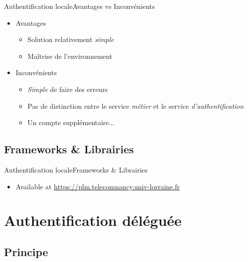 \documentclass{beamer}
\begin{document}
\begin{frame}{Authentification locale}{Avantages vs Inconvénients}
  \begin{center}
    \begin{itemize}
      \item Avantages
      \begin{itemize}
        \item Solution relativement \emph{simple}
        \item Maîtrise de l'environnement
      \end{itemize}
      \pause
      \item Inconvénients
      \begin{itemize}
        \item \emph{Simple} de faire des erreurs
        \item Pas de distinction entre le service \emph{métier} et le service \emph{d'authentification}
        \item Un compte supplémentaire...
      \end{itemize}
    \end{itemize}
  \end{center}
\end{frame}

\subsection{Frameworks \& Librairies}

\begin{frame}{Authentification locale}{Frameworks \& Librairies}
  \begin{center}
    \begin{itemize}
    \item Available at \url{https://plm.telecomnancy.univ-lorraine.fr}
    \end{itemize}
  \end{center}
\end{frame}

\section{Authentification déléguée}

\subsection{Principe}
\end{document}
